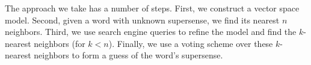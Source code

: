 \documentclass{article}
\begin{document}

The approach we take has a number of steps.
First, we construct a vector space model.
Second, given a word with unknown supersense, we find its nearest $n$ neighbors.
Third, we use search engine queries to refine the model and find the $k$-nearest neighbors (for $k< n$).
Finally, we use a voting scheme over these $k$-nearest neighbors to form a guess of the word's supersense.
\end{document}
